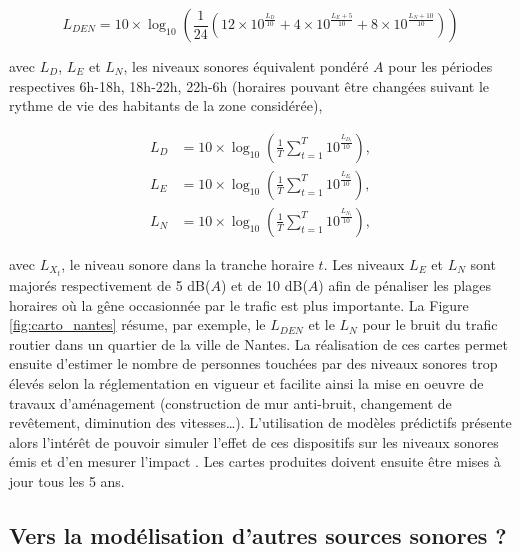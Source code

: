 \begin{equation}
L_{DEN} = 10\times\log_{10} \left(\frac{1}{24} \left(12\times10^{\frac{L_D}{10}}+4\times10^{\frac{L_E+5}{10}}+8\times10^{\frac{L_N+10}{10}} \right)\right)
\end{equation}

avec $L_D$, $L_E$ et $L_N$, les niveaux sonores équivalent pondéré $A$ pour les périodes respectives 6h-18h, 18h-22h, 22h-6h (horaires pouvant être changées suivant le rythme de vie des habitants de la zone considérée),

\begin{subequations}
\begin{align}
L_D &= 10\times\log_{10}\left(\frac{1}{T} \sum_{t = 1}^{T}10^{\frac{L_{D_t}}{10}}\right),\\
L_E &= 10\times\log_{10}\left(\frac{1}{T} \sum_{t = 1}^{T}10^{\frac{L_{E_t}}{10}}\right),\\
L_N &= 10\times\log_{10}\left(\frac{1}{T} \sum_{t = 1}^{T}10^{\frac{L_{N_t}}{10}}\right),
\end{align}
\end{subequations}

avec $L_{X_t}$, le niveau sonore dans la tranche horaire $t$. Les niveaux $L_E$ et $L_N$ sont majorés respectivement de 5 dB($A$) et de 10 dB($A$) afin de pénaliser les plages horaires où la gêne occasionnée par le trafic est plus importante. La Figure \ref{fig:carto_nantes} résume, par exemple, le $L_{DEN}$ et le $L_N$ pour le bruit du trafic routier dans un quartier de la ville de Nantes.
La réalisation de ces cartes permet ensuite d'estimer le nombre de personnes touchées par des niveaux sonores trop élevés selon la réglementation en vigueur et facilite ainsi la mise en oeuvre de travaux d'aménagement (construction de mur anti-bruit, changement de revêtement, diminution des vitesses\dots). L'utilisation de modèles prédictifs présente alors l'intérêt de pouvoir simuler l'effet de ces dispositifs sur les niveaux sonores émis et d'en mesurer l'impact \cite{murphy2011scenario,guedes2011influence}. Les cartes produites doivent ensuite être mises à jour tous les 5 ans.


\subsection{Vers la modélisation d'autres sources sonores ?}

